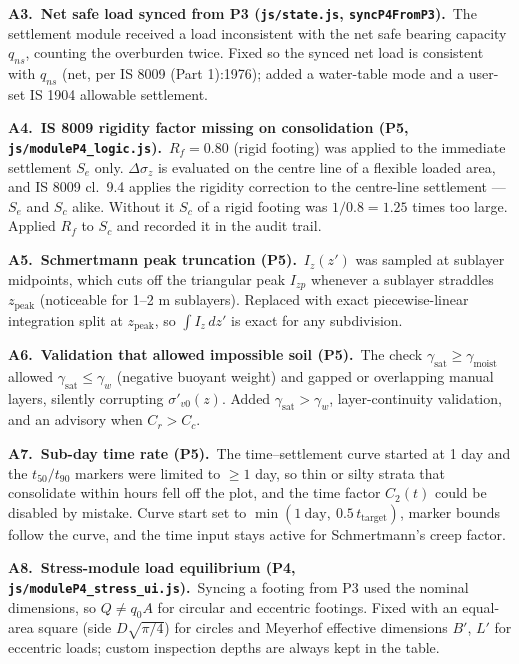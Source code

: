 \documentclass[11pt,a4paper]{article}
\newcommand{\code}[1]{\texttt{\small #1}}
\newcommand{\auditem}[3]{\par\medskip\textbf{\color{accent}#1.\ #2.}\ #3\par}
\begin{document}
\auditem{A3}{Net safe load synced from P3 (\code{js/state.js}, \code{syncP4FromP3})}{The settlement module received a
load inconsistent with the net safe bearing capacity $q_{ns}$, counting the overburden twice. Fixed so the synced net
load is consistent with $q_{ns}$ (net, per IS 8009 (Part 1):1976); added a water-table mode and a user-set IS 1904
allowable settlement.}

\auditem{A4}{IS 8009 rigidity factor missing on consolidation (P5, \code{js/moduleP4\_logic.js})}{$R_f = 0.80$ (rigid
footing) was applied to the immediate settlement $S_e$ only. $\Delta\sigma_z$ is evaluated on the centre line of a
flexible loaded area, and IS 8009 cl.~9.4 applies the rigidity correction to the centre-line settlement --- $S_e$ and
$S_c$ alike. Without it $S_c$ of a rigid footing was $1/0.8 = 1.25$ times too large. Applied $R_f$ to $S_c$ and
recorded it in the audit trail.}

\auditem{A5}{Schmertmann peak truncation (P5)}{$I_z(z')$ was sampled at sublayer midpoints, which cuts off the
triangular peak $I_{zp}$ whenever a sublayer straddles $z_\text{peak}$ (noticeable for 1--2 m sublayers). Replaced
with exact piecewise-linear integration split at $z_\text{peak}$, so $\int I_z\,dz'$ is exact for any subdivision.}

\auditem{A6}{Validation that allowed impossible soil (P5)}{The check $\gamma_\text{sat} \ge \gamma_\text{moist}$
allowed $\gamma_\text{sat} \le \gamma_w$ (negative buoyant weight) and gapped or overlapping manual layers, silently
corrupting $\sigma'_{v0}(z)$. Added $\gamma_\text{sat} > \gamma_w$, layer-continuity validation, and an advisory when
$C_r > C_c$.}

\auditem{A7}{Sub-day time rate (P5)}{The time--settlement curve started at 1 day and the $t_{50}/t_{90}$ markers were
limited to $\ge 1$ day, so thin or silty strata that consolidate within hours fell off the plot, and the time factor
$C_2(t)$ could be disabled by mistake. Curve start set to $\min(1\ \text{day},\ 0.5\,t_\text{target})$, marker bounds
follow the curve, and the time input stays active for Schmertmann's creep factor.}

\auditem{A8}{Stress-module load equilibrium (P4, \code{js/moduleP4\_stress\_ui.js})}{Syncing a footing from P3 used
the nominal dimensions, so $Q \ne q_0 A$ for circular and eccentric footings. Fixed with an equal-area square (side
$D\sqrt{\pi/4}$) for circles and Meyerhof effective dimensions $B'$, $L'$ for eccentric loads; custom inspection depths
are always kept in the table.}
\end{document}
